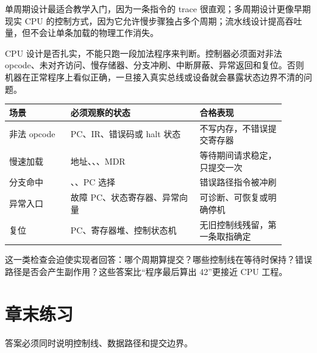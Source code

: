 单周期设计最适合教学入门，因为一条指令的 trace 很直观；多周期设计更像早期现实 CPU 的控制方式，因为它允许慢步骤独占多个周期；流水线设计提高吞吐量，但不会让单条加载的物理工作消失。

CPU 设计是否扎实，不能只跑一段加法程序来判断。控制器必须面对非法 opcode、未对齐访问、慢存储器、分支冲刷、中断屏蔽、异常返回和复位。否则机器在正常程序上看似正确，一旦接入真实总线或设备就会暴露状态边界不清的问题。

\begin{longtable}{L{0.2\linewidth}L{0.42\linewidth}L{0.28\linewidth}}
\toprule
场景 & 必须观察的状态 & 合格表现 \\
\midrule
非法 opcode & PC、IR、错误码或 halt 状态 & 不写内存，不错误提交寄存器 \\
慢速加载 & 地址、、、MDR & 等待期间请求稳定，只提交一次 \\
分支命中 & 、、PC 选择 & 错误路径指令被冲刷 \\
异常入口 & 故障 PC、状态寄存器、异常向量 & 可诊断、可恢复或明确停机 \\
复位 & PC、寄存器堆、控制状态机 & 无旧控制线残留，第一条取指确定 \\
\bottomrule
\end{longtable}

这一类检查会迫使实现者回答：哪个周期算提交？哪些控制线在等待时保持？错误路径是否会产生副作用？这些答案比“程序最后算出 42”更接近 CPU 工程。



\section*{章末练习}

答案必须同时说明控制线、数据路径和提交边界。

